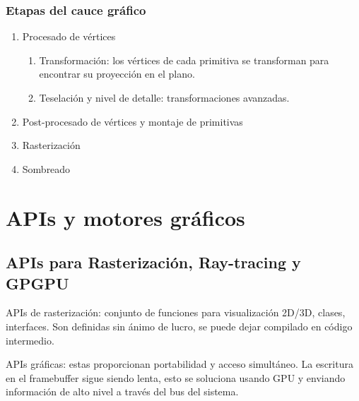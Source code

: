 \documentclass[12pt]{book} %
\providecommand{\tightlist}{%
  \setlength{\itemsep}{0pt}\setlength{\parskip}{0pt}}
\begin{document}
\hypertarget{etapas-del-cauce-gruxe1fico}{%
\subsubsection{Etapas del cauce
gráfico}\label{etapas-del-cauce-gruxe1fico}}

\begin{enumerate}
\def\labelenumi{\arabic{enumi}.}
\tightlist
\item
  Procesado de vértices

  \begin{enumerate}
  \def\labelenumii{\arabic{enumii}.}
  \tightlist
  \item
    Transformación: los vértices de cada primitiva se transforman para
    encontrar su proyección en el plano.\\
  \item
    Teselación y nivel de detalle: transformaciones avanzadas.\\
  \end{enumerate}
\item
  Post-procesado de vértices y montaje de primitivas\\
\item
  Rasterización\\
\item
  Sombreado
\end{enumerate}


\hypertarget{apis-y-motores-gruxe1ficos}{%
\section{APIs y motores gráficos}\label{apis-y-motores-gruxe1ficos}}

\hypertarget{apis-para-rasterizaciuxf3n-ray-tracing-y-gpgpu}{%
\subsection{APIs para Rasterización, Ray-tracing y
GPGPU}\label{apis-para-rasterizaciuxf3n-ray-tracing-y-gpgpu}}

APIs de rasterización: conjunto de funciones para visualización 2D/3D,
clases, interfaces. Son definidas sin ánimo de lucro, se puede dejar
compilado en código intermedio.

APIs gráficas: estas proporcionan portabilidad y acceso simultáneo. La
escritura en el framebuffer sigue siendo lenta, esto se soluciona usando
GPU y enviando información de alto nivel a través del bus del sistema.
\end{document}

